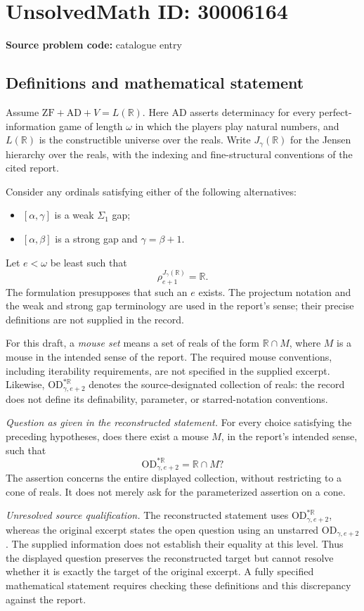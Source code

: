 \documentclass[11pt]{article}
\begin{document}
\section*{UnsolvedMath ID: 30006164}
\textbf{Source problem code:} catalogue entry
\subsection{Definitions and mathematical statement}
Assume \(\mathrm{ZF}+\mathrm{AD}+V=L(\mathbb R)\). Here \(\mathrm{AD}\) asserts determinacy for every perfect-information game of length \(\omega\) in which the players play natural numbers, and \(L(\mathbb R)\) is the constructible universe over the reals. Write \(J_\gamma(\mathbb R)\) for the Jensen hierarchy over the reals, with the indexing and fine-structural conventions of the cited report.

Consider any ordinals satisfying either of the following alternatives:
\begin{itemize}
\item \([\alpha,\gamma]\) is a weak \(\Sigma_1\) gap;
\item \([\alpha,\beta]\) is a strong gap and \(\gamma=\beta+1\).
\end{itemize}
Let \(e<\omega\) be least such that
\[
\rho_{e+1}^{J_\gamma(\mathbb R)}=\mathbb R.
\]
The formulation presupposes that such an \(e\) exists. The projectum notation and the weak and strong gap terminology are used in the report's sense; their precise definitions are not supplied in the record.

For this draft, a \emph{mouse set} means a set of reals of the form \(\mathbb R\cap M\), where \(M\) is a mouse in the intended sense of the report. The required mouse conventions, including iterability requirements, are not specified in the supplied excerpt. Likewise, \(\mathrm{OD}^{*\mathbb R}_{\gamma,e+2}\) denotes the source-designated collection of reals: the record does not define its definability, parameter, or starred-notation conventions.

\emph{Question as given in the reconstructed statement.} For every choice satisfying the preceding hypotheses, does there exist a mouse \(M\), in the report's intended sense, such that
\[
\mathrm{OD}^{*\mathbb R}_{\gamma,e+2}=\mathbb R\cap M?
\]
The assertion concerns the entire displayed collection, without restricting to a cone of reals. It does not merely ask for the parameterized assertion on a cone.

\emph{Unresolved source qualification.} The reconstructed statement uses \(\mathrm{OD}^{*\mathbb R}_{\gamma,e+2}\), whereas the original excerpt states the open question using an unstarred \(\mathrm{OD}_{\gamma,e+2}\). The supplied information does not establish their equality at this level. Thus the displayed question preserves the reconstructed target but cannot resolve whether it is exactly the target of the original excerpt. A fully specified mathematical statement requires checking these definitions and this discrepancy against the report.
\end{document}
